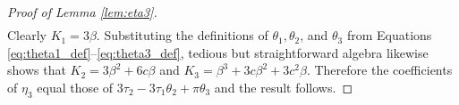 \begin{proof}[Proof of Lemma \ref{lem:eta3}]
\begin{align*}
\end{align*}
Clearly $K_1 = 3\beta$.
Substituting the definitions of $\theta_1, \theta_2$, and $\theta_3$ from Equations \ref{eq:theta1_def}--\ref{eq:theta3_def}, tedious but straightforward algebra likewise shows that $K_2 = 3\beta^2 + 6c\beta$ and $K_3 = \beta^3 + 3c\beta^2 + 3c^2\beta$.
Therefore the coefficients of $\eta_3$ equal those of $3\tau_2 - 3\tau_1 \theta_2 + \pi \theta_3$ and the result follows.
\end{proof}


